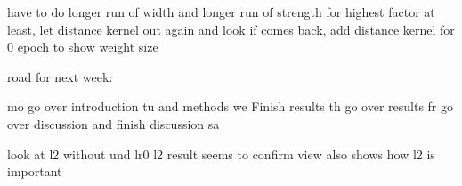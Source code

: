 \begin{comment}
example picture:
\begin{figure}[h]\label{fig:MobileNetV2_baseline}
    \begin{center}
        \begin{tikzpicture}
            \begin{groupplot}[
                group style={
                group size=2 by 1,
                horizontal sep=10pt,
                group name=G},
                width=8cm,
            ]

            \nextgroupplot[
            grid=major, 
            grid style={dashed,gray!30},
            xlabel=Epoch, %
            ylabel=Validation Accuracy,
            ymin=0.8]
            \addplot[mark=None, color=red] 
                table[x=Step, y=Value, col sep=comma]{images/network_csv/baseline/MobileNetV2/MobileNetV2_baseline_validation_acuracy.csv};
            \addplot[mark=None, color=blue] 
                table[x=Step, y=Value, col sep=comma]{images/network_csv/baseline/baseline_distance/MobileNetV2_baseline_distance_validation_acuracy.csv};
            
            \nextgroupplot[
                grid=major, 
                grid style={dashed,gray!30},
                xlabel=Epoch, %
                ylabel=Distance,
                yticklabel pos=right,
                ylabel near ticks]
                \addplot[mark=None, color=red] 
                    table[x=Step, y=Value, col sep=comma]{images/network_csv/baseline/baseline/MobileNetV2_baseline_distance0.csv};
                \addplot[mark=None, color=blue] 
                    table[x=Step, y=Value, col sep=comma]{images/network_csv/baseline/baseline_distance/MobileNetV2_baseline_distance_distance0.csv};
    
            \end{groupplot}
        \end{tikzpicture}
        \caption{Validation accuray (left) and Distance values (right) for a network trained without distance function (red) and with distance function (blue).}
    \end{center}
\end{figure}

\end{comment}



have to do longer run of width and longer run of strength for highest factor at
least, let distance kernel out again and look if comes back, add distance kernel
for 0 epoch to show weight size





road for next week:



mo  go over introduction
tu  and methods
we  Finish results
th  go over results
fr  go over discussion and finish discussion
sa  


look at l2 without und lr0
l2 result seems to confirm view also shows how l2 is important
